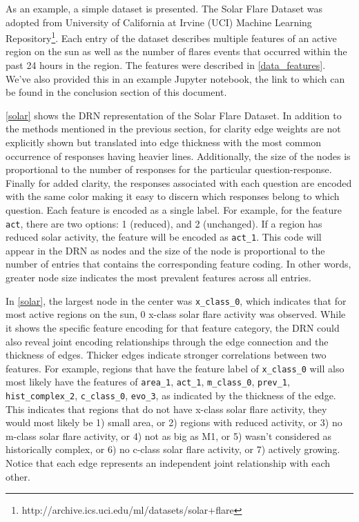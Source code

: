 As an example, a simple dataset is presented. The Solar Flare Dataset was adopted from University of California at Irvine (UCI) Machine Learning Repository\footnote{http://archive.ics.uci.edu/ml/datasets/solar+flare}. Each entry of the dataset describes multiple features of an active region on the sun as well as the number of flares events that occurred within the past 24 hours in the region. The features were described in \autoref{data_features}.  We've also provided this in an example Jupyter notebook, the link to which can be found in the conclusion section of this document.

\autoref{solar} shows the DRN representation of the Solar Flare Dataset. In addition to the methods mentioned in the previous section, for clarity edge weights are not explicitly shown but translated into edge thickness with the most common occurrence of responses having heavier lines. Additionally, the size of the nodes is proportional to the number of responses for the particular question-response. Finally for added clarity, the responses associated with each question are encoded with the same color making it easy to discern which responses belong to which question. Each feature is encoded as a single label. For example, for the feature \texttt{act}, there are two options: 1 (reduced), and 2 (unchanged). If a region has reduced solar activity, the feature will be encoded as \texttt{act\_1}. This code will appear in the DRN as nodes and the size of the node is proportional to the number of entries that contains the corresponding feature coding. In other words, greater node size indicates the most prevalent features across all entries.

In \autoref{solar}, the largest node in the center was \texttt{x\_class\_0}, which indicates that for most active regions on the sun, 0 x-class solar flare activity was observed. While it shows the specific feature encoding for that feature category, the DRN could also reveal joint encoding relationships through the edge connection and the thickness of edges. Thicker edges indicate stronger correlations between two features. For example, regions that have the feature label of \texttt{x\_class\_0} will also most likely have the features of \texttt{area\_1}, \texttt{act\_1}, \texttt{m\_class\_0}, \texttt{prev\_1}, \texttt{hist\_complex\_2}, \texttt{c\_class\_0}, \texttt{evo\_3}, as indicated by the thickness of the edge. This indicates that regions that do not have x-class solar flare activity, they would most likely be 1) small area, or 2) regions with reduced activity, or 3) no m-class solar flare activity, or 4) not as big as M1, or 5) wasn't considered as historically complex, or 6) no c-class solar flare activity, or 7) actively growing. Notice that each edge represents an independent joint relationship with each other.

